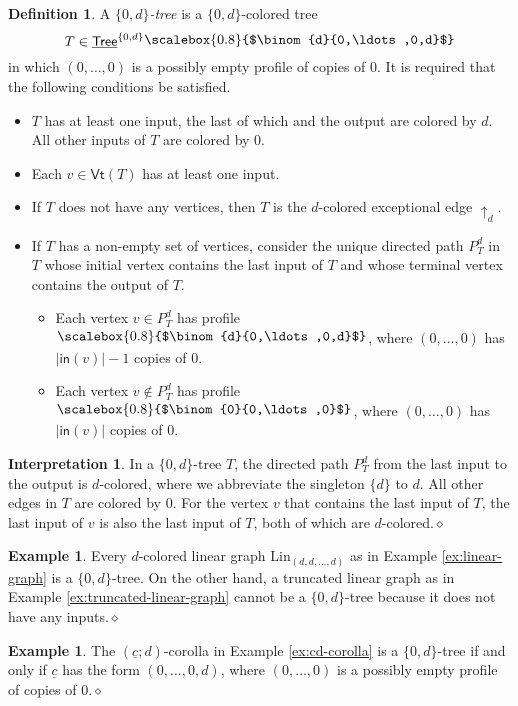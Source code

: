 \documentclass{amsbook}
\numberwithin{section}{chapter}
\numberwithin{subsection}{section}
\numberwithin{equation}{section}
\theoremstyle{plain}
\theoremstyle{definition}
\newtheorem{definition}[equation]{Definition}
\newtheorem{example}[equation]{Example}
\newtheorem{interpretation}[equation]{Interpretation}
\newcommand{\Lin}{\mathrm{Lin}}
\newcommand{\Vt}{\mathsf{Vt}}
\newcommand{\zerod}{\{0,d\}}
\newcommand{\dqed}{\hfill$\diamond$}
\newcommand{\Tree}{\mathsf{Tree}}
\newcommand{\uTree}{\underline{\Tree}}
\newcommand{\uTreezerod}{\uTree^{\zerod}}
\newcommand{\uc}{\underline c}
\newcommand{\smallprof}[1]
{\raisebox{.05cm}{\scalebox{0.8}{#1}}}
\newcommand{\dzerozerod}{\smallprof{$\binom{d}{0,\ldots,0,d}$}}
\newcommand{\zerozerozero}{\smallprof{$\binom{0}{0,\ldots,0}$}}
\newcommand{\inp}{\mathsf{in}}
\begin{document}
\begin{definition}\label{def:painted-tree}
A \index{tree!$\zerod$-}\emph{$\zerod$-tree} is a $\zerod$-colored tree \[T \in \uTreezerod\dzerozerod\] in which $(0,\ldots,0)$ is a possibly empty profile of copies of $0$.  It is required that the following conditions be satisfied. 
\begin{itemize}\item $T$ has at least one input, the last of which and the output are colored by $d$.  All other inputs of $T$ are colored by $0$.
\item Each $v \in \Vt(T)$ has at least one input.
\item If $T$ does not have any vertices, then $T$ is the $d$-colored exceptional edge $\uparrow_d$.
\item If $T$ has a non-empty set of vertices, consider the unique directed path $P^d_T$ in $T$ whose initial vertex contains the last input of $T$ and whose terminal vertex contains the output of $T$. 
\begin{itemize}\item Each vertex $v \in P^d_T$ has profile $\dzerozerod$, where $(0,\ldots,0)$ has $|\inp(v)|-1$ copies of $0$.
\item Each vertex $v\not\in P^d_T$ has profile $\zerozerozero$, where $(0,\ldots,0)$ has $|\inp(v)|$ copies of $0$.
\end{itemize}
\end{itemize}
\end{definition}

\begin{interpretation} In a $\zerod$-tree $T$, the directed path $P^d_T$ from the last input to the output is $d$-colored, where we abbreviate the singleton $\{d\}$ to $d$.  All other edges in $T$ are colored by $0$.  For the vertex $v$ that contains the last input of $T$, the last input of $v$ is also the last input of $T$, both of which are $d$-colored.\dqed
\end{interpretation}

\begin{example} Every $d$-colored linear graph $\Lin_{(d,d,\ldots,d)}$ as in Example \ref{ex:linear-graph} is a $\zerod$-tree.  On the other hand, a truncated linear graph as in Example \ref{ex:truncated-linear-graph} cannot be a $\zerod$-tree because it does not have any inputs.\dqed\end{example}

\begin{example} The $(\uc;d)$-corolla in Example \ref{ex:cd-corolla} is a $\zerod$-tree if and only if $\uc$ has the form $(0,\ldots,0,d)$, where $(0,\ldots,0)$ is a possibly empty profile of copies of $0$.\dqed\end{example}
\end{document}
